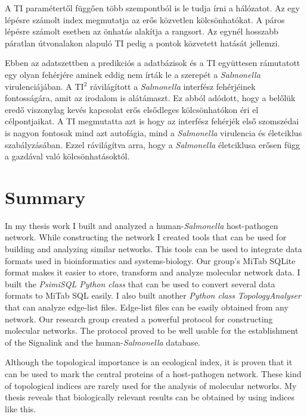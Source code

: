 \documentclass[a4paper,12pt]{article}
\providecommand{\DIFaddtex}[1]{{\protect\color{blue}\uwave{#1}}} %
\providecommand{\DIFaddbegin}{} %
\providecommand{\DIFaddend}{} %
\providecommand{\DIFadd}[1]{\texorpdfstring{\DIFaddtex{#1}}{#1}} %
\begin{document}
		A TI paramétertől függően több szempontból is le tudja írni a hálózatot. Az egy lépésre számolt index megmutatja az erős közvetlen kölcsönhatókat. A páros lépésre számolt esetben az önhatás alakítja a rangsort. Az egynél hosszabb páratlan útvonalakon alapuló TI pedig a pontok közvetett hatását jellemzi.

		Ebben az adatszettben a predikciós a adatbázisok és a TI együttesen rámutatott egy olyan fehérjére aminek eddig nem írták le a szerepét a \textit{Salmonella} virulenciájában. A TI$^2$ rávilágított a \textit{Salmonella} interfész fehérjéinek fontosságára, amit az irodalom is alátámaszt. Ez abból adódott, hogy a belőlük eredő viszonylag kevés kapcsolat erős elsődleges kölcsönhatókon éri el célpontjaikat. A TI megmutatta azt is hogy az interfész fehérjék első szomszédai is nagyon fontosak mind azt autofágia, mind a \textit{Salmonella} virulencia és életciklus szabályzásában. Ezzel rávilágítva arra, hogy a \textit{Salmonella} életciklusa erősen függ a gazdával való kölcsönhatásoktól.


		\pagebreak



\section{Summary}
\DIFaddbegin 

    \DIFadd{Ezt is átírni az új összefoglalás alapján
}\DIFaddend 

		In my thesis work I built and analyzed a human-\textit{Salmonella} host-pathogen network. While constructing the network I created tools that can be used for building and analyzing similar networks. This tools can be used to integrate data formats used in bioinformatics and systems-biology. Our group's MiTab SQLite format makes it easier to  store, transform and analyze molecular network data.
		I built the \textit{PsimiSQL Python class} that can be used to convert several data formats to MiTab SQL easily. I also built another \textit{Python class} \textit{TopologyAnalyser} that can analyze edge-list files. Edge-list files can be easily obtained from any network. Our research group created a powerful protocol for constructing molecular networks. The protocol proved to be well usable for the establishment of the Signalink and the human-\textit{Salmonella} database.

		Although the topological importance is an ecological index, it is proven that it can be used to mark the central proteins of a host-pathogen network. These kind of topological indices are rarely used for the analysis of molecular networks. My thesis reveals that biologically relevant results can be obtained by using indices like this.
\end{document}
